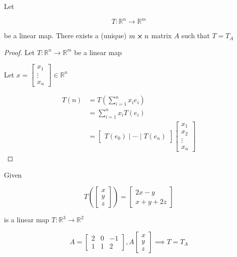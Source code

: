 \begin{theorem}
	Let

	\begin{equation} \label{eq:matrix-map-thm}
		T: \mathbb{R}^n \to \mathbb{R}^m
	\end{equation}

	be a linear map. There exists a (unique) $m\cross n$ matrix $A$ such that $T = T_A$
	
	\begin{proof}
		Let $T:\mathbb{R}^n \to \mathbb{R}^m$ be a linear map

		Let $x = \begin{bmatrix}
			x_1\\\vdots\\x_n
		\end{bmatrix} \in \mathbb{R}^n$

		\begin{align}
			T(n) &= T\left(\sum_{i=1}^{n}x_i e_i\right)\\
			&= \sum_{i=1}^{n} x_i T(e_i)\\
			&= \begin{bmatrix}
				T(e_0) \mid \cdots \mid T(e_n)
			\end{bmatrix} \begin{bmatrix}
				x_1\\x_2\\\vdots\\x_n
			\end{bmatrix}
		\end{align}

	\end{proof}
\end{theorem}

\begin{example}
	Given
	
	\[T\left(\begin{bmatrix}
		x\\y\\z
	\end{bmatrix}\right)=\begin{bmatrix}
		2x-y\\x+y+2z
	\end{bmatrix}\]

	is a linear map $T: \mathbb{R}^3 \to \mathbb{R}^2$ 

	\[A = \begin{bmatrix}
		2&0&-1\\1&1&2
	\end{bmatrix}, A \begin{bmatrix}
		x\\y\\z
	\end{bmatrix} \implies T = T_A\]
\end{example}

